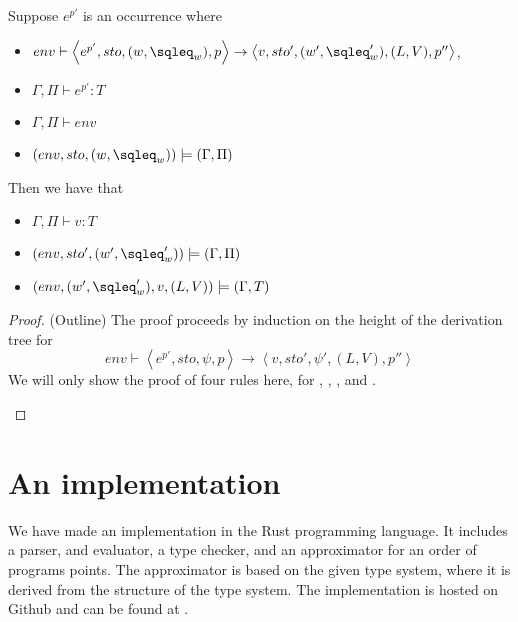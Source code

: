 \documentclass{eptcs}
\begin{document}
\begin{theorem}[Soundness]
	Suppose $e^{p'}$ is an occurrence where
	\begin{itemize}
		\item $env\vdash\left\langle e^{p'},sto,(w,\sqleq_w),p\right\rangle\rightarrow\left\langle v,sto',(w',\sqleq_w'),(L,V),p''\right\rangle$,
		\item $\Gamma,\Pi\vdash e^{p'} : T$
		\item $\Gamma,\Pi\vdash env$
		\item $(env,sto,(w,\sqleq_w))\models(\Gamma,\Pi)$
	\end{itemize}
	Then we have that
	\begin{itemize}
		\item $\Gamma,\Pi\vdash v:T$
		\item $(env,sto',(w',\sqleq_w'))\models(\Gamma,\Pi)$
		\item $(env,(w',\sqleq_w'),v,(L,V))\models(\Gamma,T)$
	\end{itemize}
\end{theorem}
\begin{proof}(Outline)
	The proof proceeds by induction on the height of the derivation tree for 
	$$env\vdash\left\langle e^{p'},sto,\psi,p\right\rangle\rightarrow\left\langle v,sto',\psi',(L,V),p''\right\rangle$$
	We will only show the proof of four rules here, for
        , , , and .

	\begin{description}
		
		
		
	\end{description}
\end{proof}

% 

\section{An implementation}

We have made an implementation in the Rust programming language. It
includes a parser, and evaluator, a type checker, and an approximator
for an order of programs points. The approximator is based on the
given type system, where it is derived from the structure of the type
system.  The implementation is hosted on Github and can be found at
\cite{df_implementation}.
\end{document}
